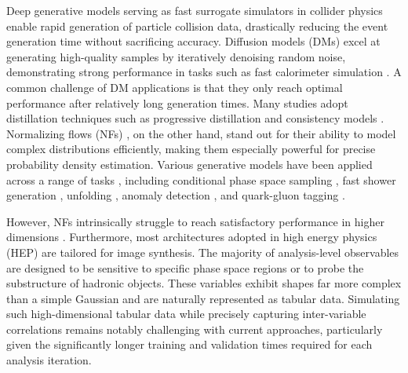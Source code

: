 \documentclass[%
 reprint,
 amsmath,amssymb,
 aps,
prd,
floatfix,
]{revtex4-2}
\begin{document}
Deep generative models serving as fast surrogate simulators in collider physics enable rapid generation of particle collision data, drastically reducing the event generation time without sacrificing accuracy. Diffusion models (DMs) \cite{score,ddpm,diffusionbeatgan} excel at generating high-quality samples by iteratively denoising random noise, demonstrating strong performance in tasks such as fast calorimeter simulation \cite{calodiffu,caloscore,caloscore2,calocloud2,directdiff,pcjedi}. A common challenge of DM applications is that they only reach optimal performance after relatively long generation times. Many studies adopt distillation techniques such as progressive distillation and consistency models \cite{pd,cm,icm}. Normalizing flows (NFs) \cite{nfreview,inn}, on the other hand, stand out for their ability to model complex distributions efficiently, making them especially powerful for precise probability density estimation. Various generative models have been applied across a range of tasks \cite{calogan,calom,caloqvae,caloshowergan,deeptreegan}, including conditional phase space sampling \cite{madnis,madnis2,zunis,mm,nfeventgen,iflow,cqmnf}, fast shower generation \cite{caloflow,caloflow2,calopointflow2,l2flow,supercalo}, unfolding \cite{cinnfold,sbfold}, anomaly detection \cite{ad1,adben,nfad1,treead1}, and quark-gluon tagging \cite{qg}.

However, NFs intrinsically struggle to reach satisfactory performance in higher dimensions \cite{glow,fm}. Furthermore, most architectures adopted in high energy physics (HEP) are tailored for image synthesis. The majority of analysis-level observables are designed to be sensitive to specific phase space regions or to probe the substructure of hadronic objects. These variables exhibit shapes far more complex than a simple Gaussian and are naturally represented as tabular data. Simulating such high-dimensional tabular data while precisely capturing inter-variable correlations remains notably challenging with current approaches, particularly given the significantly longer training and validation times required for each analysis iteration.
\end{document}
